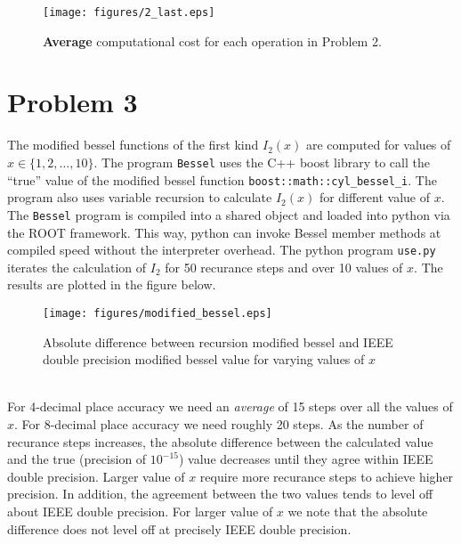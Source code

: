 \documentclass[singlepage,notitlepage,nofootinbib,11pt]{revtex4-1}
\begin{document}
\begin{figure}
\centering
\texttt{[image: figures/2\_last.eps]}
\caption{{\bf Average} computational cost for each operation in Problem 2.}
\end{figure}
\clearpage
\section{Problem 3}
The modified bessel functions of the first kind $I_2(x)$ are computed for values of $x\in\{1,2,\dots,10\}$. The program \verb|Bessel| uses the C++ boost library to call the ``true'' value of the modified bessel function \verb|boost::math::cyl_bessel_i|. The program also uses variable recursion to calculate $I_2(x)$ for different value of $x$. The \verb|Bessel| program is compiled into a shared object and loaded into python via the ROOT framework. This way, python can invoke Bessel member methods at compiled speed without the interpreter overhead. The python program \verb|use.py| iterates the calculation of $I_2$ for 50 recurance steps and over 10 values of $x$. The results are plotted in the figure below. 
\begin{figure}[h]
\centering
\texttt{[image: figures/modified\_bessel.eps]}
\caption{Absolute difference between recursion modified bessel and IEEE double precision modified bessel value for varying values of $x$}
\end{figure}\\
\indent For 4-decimal place accuracy we need an {\it average} of 15 steps over all the values of $x$. For 8-decimal place accuracy we need roughly 20 steps. As the number of recurance steps increases, the absolute difference between the calculated value and the true (precision of $10^{-15}$) value decreases until they agree within IEEE double precision. Larger value of $x$ require more recurance steps to achieve higher precision. In addition, the agreement between the two values tends to level off about IEEE double precision. For larger value of $x$ we note that the absolute difference does not level off at precisely IEEE double precision. 
\end{document}
